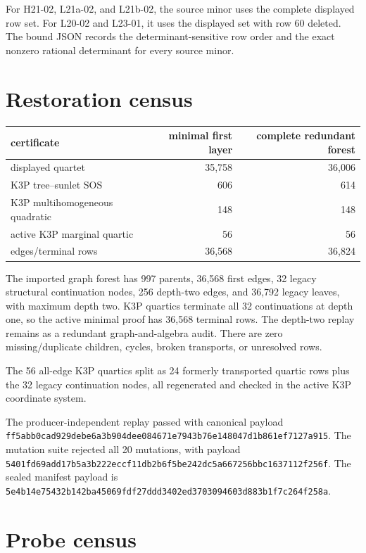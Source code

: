 \documentclass[10pt]{article}
\newcommand{\sha}[1]{\nolinkurl{#1}}
\begin{document}
For H21-02, L21a-02, and L21b-02, the source minor uses the complete displayed
row set.  For L20-02 and L23-01, it uses the displayed set with row 60
deleted.  The bound JSON records the determinant-sensitive row order and the
exact nonzero rational determinant for every source minor.

\section{Restoration census}

\begin{center}
\begin{tabular}{lrr}
\toprule
certificate & minimal first layer & complete redundant forest\\
\midrule
displayed quartet & 35,758 & 36,006\\
K3P tree--sunlet SOS & 606 & 614\\
K3P multihomogeneous quadratic & 148 & 148\\
active K3P marginal quartic & 56 & 56\\
\midrule
edges/terminal rows & 36,568 & 36,824\\
\bottomrule
\end{tabular}
\end{center}

The imported graph forest has 997 parents, 36,568 first edges,
32 legacy structural continuation nodes, 256 depth-two edges, and 36,792 legacy
leaves, with maximum depth two.  K3P quartics terminate all 32 continuations
at depth one, so the active minimal proof has 36,568 terminal rows.  The
depth-two replay remains as a redundant graph-and-algebra audit.  There are
zero missing/duplicate children, cycles, broken transports, or unresolved
rows.

The 56 all-edge K3P quartics split as 24 formerly transported quartic rows
plus the 32 legacy continuation nodes, all regenerated and checked in the
active K3P coordinate system.

The producer-independent replay passed with canonical payload
\sha{ff5abb0cad929debe6a3b904dee084671e7943b76e148047d1b861ef7127a915}.
The mutation suite rejected all 20 mutations, with payload
\sha{5401fd69add17b5a3b222eccf11db2b6f5be242dc5a667256bbc1637112f256f}.
The sealed manifest payload is
\sha{5e4b14e75432b142ba45069fdf27ddd3402ed3703094603d883b1f7c264f258a}.

\section{Probe census}
\end{document}
